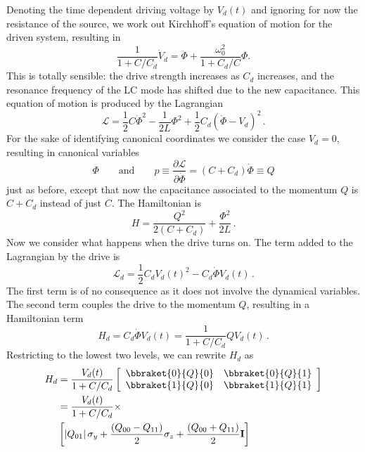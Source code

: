 Denoting the time dependent driving voltage by $V_d(t)$ and ignoring for now the resistance of the source, we work out Kirchhoff's equation of motion for the driven system, resulting in
\begin{equation}
\frac{1}{1+C/C_d} \dot{V}_d = \ddot{\Phi} + \frac{\omega_0^2}{1 + C_d/C} \Phi. \end{equation}
This is totally sensible: the drive strength increases as $C_d$ increases, and the resonance frequency of the LC mode has shifted due to the new capacitance.
This equation of motion is produced by the Lagrangian
\begin{equation}
\mathcal{L} = \frac{1}{2}C \dot{\Phi}^2 - \frac{1}{2L}\Phi^2 + \frac{1}{2} C_d \left( \dot{\Phi} - V_d \right)^2 \, .
\end{equation}
For the sake of identifying canonical coordinates we consider the case $V_d=0$, resulting in canonical variables
\begin{equation*}
  \Phi
  \qquad \textrm{and} \qquad
  p \equiv \frac{\partial \mathcal{L}}{\partial \dot{\Phi}} = \left( C + C_d \right) \dot{\Phi} \equiv Q
\end{equation*}
just as before, except that now the capacitance associated to the momentum $Q$ is $C+C_d$ instead of just $C$.
The Hamiltonian is
\begin{equation}
H = \frac{Q^2}{2 (C + C_d)} + \frac{\Phi^2}{2L} \, .
\end{equation}
Now we consider what happens when the drive turns on.
The term added to the Lagrangian by the drive is
\begin{equation}
  \mathcal{L}_d = \frac{1}{2}C_d V_d(t)^2 - C_d \dot{\Phi} V_d(t) \, .
\end{equation}
The first term is of no consequence as it does not involve the dynamical variables.
The second term couples the drive to the momentum $Q$, resulting in a Hamiltonian term
\begin{equation*}
H_d
  = C_d \dot{\Phi}V_d(t)
  = \frac{1}{1+C/C_d} Q V_d(t) \, . \label{eq:sec:driving:H_dVsCircuitParams}
\end{equation*}
Restricting to the lowest two levels, we can rewrite $H_d$ as
\begin{align}
  H_d
  &= \frac{V_d(t)}{1 + C/C_d}
  \left[ \begin{array}{cc}
    \bbraket{0}{Q}{0} & \bbraket{0}{Q}{1} \\
    \bbraket{1}{Q}{0} & \bbraket{1}{Q}{1}
  \end{array} \right] \\
  &= \frac{V_d(t)}{1 + C/C_d} \times \nonumber \\
  &\left[
    \left| Q_{01} \right| \sigma_y
    + \frac{\left( Q_{00} - Q_{11} \right)}{2} \sigma_z
    + \frac{\left( Q_{00} + Q_{11} \right)}{2} \mathbf{I}
  \right]
\end{align}
